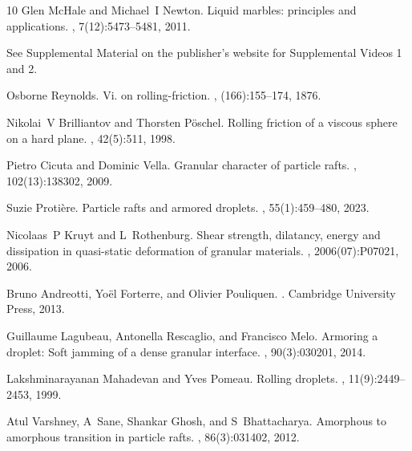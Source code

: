 \documentclass[twocolumn, prl,
 amsmath,amssymb,
 superscriptaddress,aps,
]{revtex4-2}
\begin{document}
\begin{thebibliography}{10}
	Glen McHale and Michael~I Newton.
	\newblock Liquid marbles: principles and applications.
	, 7(12):5473--5481, 2011.
	
	See Supplemental Material on the publisher's website for
	Supplemental Videos 1 and 2.
	
	Osborne Reynolds.
	\newblock Vi. on rolling-friction.
	,
	(166):155--174, 1876.
	
	Nikolai~V Brilliantov and Thorsten P{\"o}schel.
	\newblock Rolling friction of a viscous sphere on a hard plane.
	, 42(5):511, 1998.
	
	Pietro Cicuta and Dominic Vella.
	\newblock Granular character of particle rafts.
	, 102(13):138302, 2009.
	
	Suzie Proti{\`e}re.
	\newblock Particle rafts and armored droplets.
	, 55(1):459--480, 2023.
	
	Nicolaas~P Kruyt and L~Rothenburg.
	\newblock Shear strength, dilatancy, energy and dissipation in quasi-static
	deformation of granular materials.
	,
	2006(07):P07021, 2006.
	
	Bruno Andreotti, Yo{\"e}l Forterre, and Olivier Pouliquen.
	.
	\newblock Cambridge University Press, 2013.
	
	Guillaume Lagubeau, Antonella Rescaglio, and Francisco Melo.
	\newblock Armoring a droplet: Soft jamming of a dense granular interface.
	, 90(3):030201, 2014.
	
	Lakshminarayanan Mahadevan and Yves Pomeau.
	\newblock Rolling droplets.
	, 11(9):2449--2453, 1999.
	
	Atul Varshney, A~Sane, Shankar Ghosh, and S~Bhattacharya.
	\newblock Amorphous to amorphous transition in particle rafts.
	, 86(3):031402, 2012.
	

\end{thebibliography}
\end{document}
